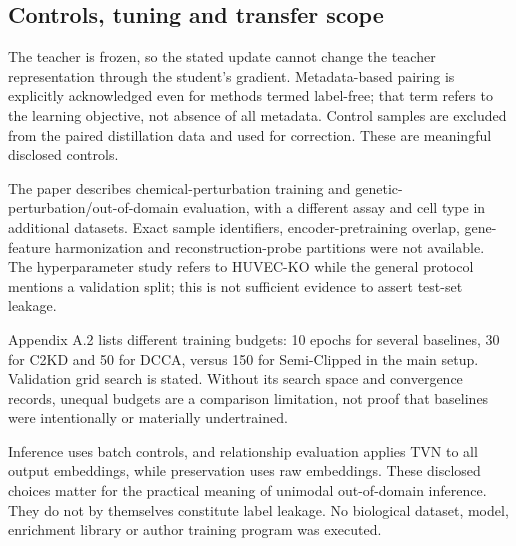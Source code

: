 \documentclass[10pt]{article}
\begin{document}
\subsection*{Controls, tuning and transfer scope}
The teacher is frozen, so the stated update cannot change the teacher representation through the student’s gradient. Metadata-based pairing is explicitly acknowledged even for methods termed label-free; that term refers to the learning objective, not absence of all metadata. Control samples are excluded from the paired distillation data and used for correction. These are meaningful disclosed controls.\par
The paper describes chemical-perturbation training and genetic-perturbation/out-of-domain evaluation, with a different assay and cell type in additional datasets. Exact sample identifiers, encoder-pretraining overlap, gene-feature harmonization and reconstruction-probe partitions were not available. The hyperparameter study refers to HUVEC-KO while the general protocol mentions a validation split; this is not sufficient evidence to assert test-set leakage.\par
Appendix A.2 lists different training budgets: 10 epochs for several baselines, 30 for C2KD and 50 for DCCA, versus 150 for Semi-Clipped in the main setup. Validation grid search is stated. Without its search space and convergence records, unequal budgets are a comparison limitation, not proof that baselines were intentionally or materially undertrained.\par
Inference uses batch controls, and relationship evaluation applies TVN to all output embeddings, while preservation uses raw embeddings. These disclosed choices matter for the practical meaning of unimodal out-of-domain inference. They do not by themselves constitute label leakage. No biological dataset, model, enrichment library or author training program was executed.\par
\end{document}
